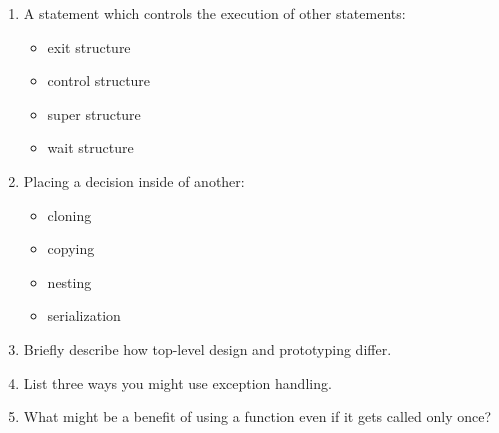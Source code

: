 \documentclass[letter,10pt]{article}
\begin{document}
\begin{enumerate}
    \item A statement which controls the execution of other statements:
    \begin{itemize}
        \item exit structure
        \item control structure
        \item super structure
        \item wait structure
    \end{itemize}

    \item Placing a decision inside of another:
    \begin{itemize}
        \item cloning
        \item copying
        \item nesting
        \item serialization
    \end{itemize}

    \item Briefly describe how top-level design and prototyping differ.

    \item List three ways you might use exception handling.

    \item What might be a benefit of using a function even if it gets called only once?

\end{enumerate}
\end{document}
